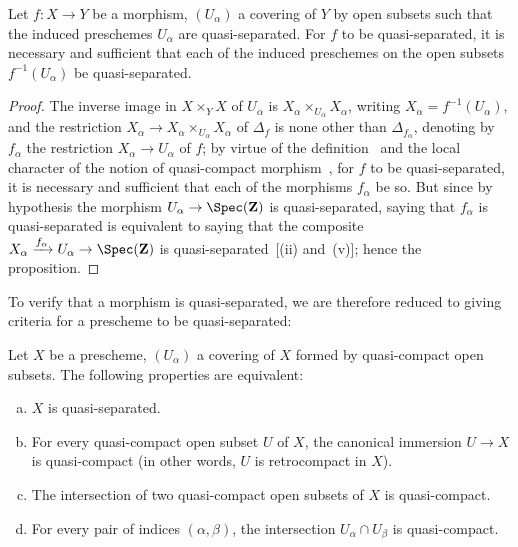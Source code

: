 \begin{proposition}[1.2.6]
\label{IV.1.2.6}
Let $f:X\to Y$ be a morphism, $(U_\alpha)$ a covering of $Y$
by open subsets such that the induced preschemes $U_\alpha$ are quasi-separated. For $f$ to be quasi-separated, it is necessary and sufficient that each of the induced preschemes on the open subsets $f^{-1}(U_\alpha)$ be
quasi-separated.
\end{proposition}

\begin{proof}
The inverse image in $X\times_Y X$ of $U_\alpha$ is $X_\alpha\times_{U_\alpha} X_\alpha$, writing $X_\alpha=f^{-1}(U_\alpha)$,
and the restriction $X_\alpha\to X_\alpha\times_{U_\alpha} X_\alpha$ of $\Delta_f$ is none other than $\Delta_{f_\alpha}$, denoting by $f_\alpha$ the restriction
$X_\alpha\to U_\alpha$ of $f$; by virtue of the definition~ and the local character of the notion of
quasi-compact morphism~, for $f$ to be quasi-separated, it is necessary and sufficient that
each of the morphisms $f_\alpha$ be so. But since by hypothesis the morphism $U_\alpha\to\Spec(\mathbf{Z})$
is quasi-separated, saying that $f_\alpha$ is quasi-separated is equivalent to saying that the composite
$X_\alpha\xrightarrow{f_\alpha} U_\alpha\to\Spec(\mathbf{Z})$ is quasi-separated~[(ii) and~(v)];
hence the proposition.
\end{proof}


To verify that a morphism is quasi-separated, we are therefore reduced to giving
criteria for a prescheme to be quasi-separated:

\begin{proposition}[1.2.7]
\label{IV.1.2.7}
Let $X$ be a prescheme, $(U_\alpha)$ a covering of $X$ formed by quasi-compact open subsets. The following properties are equivalent:
\begin{enumerate}[a)]
  \item $X$ is quasi-separated.
  \item For every quasi-compact open subset $U$ of $X$, the canonical immersion $U\to X$ is quasi-compact
    (in other words, $U$ is retrocompact in $X$).
  \item[b')] The intersection of two quasi-compact open subsets of $X$ is quasi-compact.
  \item For every pair of indices $(\alpha,\beta)$, the intersection $U_\alpha\cap U_\beta$ is quasi-compact.
\end{enumerate}
\end{proposition}

